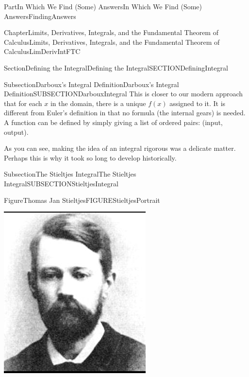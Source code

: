 \documentclass[oneside,10pt,]{book}
\numberwithin{equation}{part}
\begin{document}
\begin{partptx}{Part}{In Which We Find (Some) Answers}{}{In Which We Find (Some) Answers}{}{}{FindingAnswers}
\begin{chapterptx}{Chapter}{Limits, Derivatives, Integrals, and the Fundamental Theorem of Calculus}{}{Limits, Derivatives, Integrals, and the Fundamental Theorem of Calculus}{}{}{LimDerivIntFTC}
\begin{sectionptx}{Section}{Defining the Integral}{}{Defining the Integral}{}{}{SECTIONDefiningIntegral}
\begin{subsectionptx}{Subsection}{Darboux's Integral Definition}{}{Darboux's Integral Definition}{}{}{SUBSECTIONDarbouxIntegral}
This is closer to our modern approach that for each \(x\) in the domain, there is a unique \(f(x)\) assigned to it. It is different from Euler's definition in that no formula (the internal gears) is needed. A function can be defined by simply giving a list of ordered pairs: (input, output).%
\par
As you can see, making the idea of an integral rigorous was a delicate matter.  Perhaps this is why it took so long to develop historically.%
\end{subsectionptx}
%
%
\typeout{************************************************}
\typeout{************************************************}
%
\begin{subsectionptx}{Subsection}{The Stieltjes Integral}{}{The Stieltjes Integral}{}{}{SUBSECTIONStieltjesIntegral}
\begin{figureptx}{Figure}{Thomas Jan Stieltjes}{FIGUREStieltjesPortrait}{}%
\begin{image}{0.325}{0.35}{0.325}{}%
\includegraphics[width=\linewidth]{external/images/Stieltjes.png}
\end{image}%
\tcblower
\end{figureptx}%

\end{subsectionptx}
\end{sectionptx}
\end{chapterptx}
\end{partptx}
\end{document}
